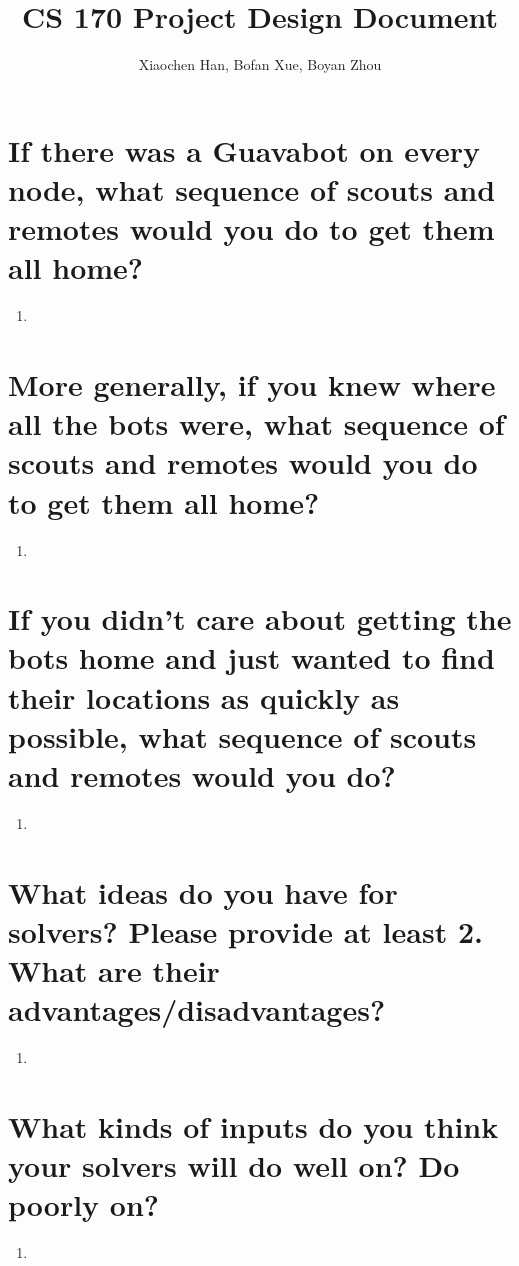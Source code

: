 \documentclass[10pt,a4paper]{article}
\author{Xiaochen Han, Bofan Xue, Boyan Zhou}
\title{CS 170 Project Design Document}
\begin{document}
\maketitle

\section{If there was a Guavabot on every node, what sequence of scouts and remotes would you do to get them all home?}
\begin{enumerate}[label=(\alph*)]
\item
\end{enumerate}

\section{More generally, if you knew where all the bots were, what sequence of scouts and remotes would you do to get them all home?}
\begin{enumerate}[label=(\alph*)]
\item
\end{enumerate}

\section{If you didn't care about getting the bots home and just wanted to find their locations as quickly as possible, what sequence of scouts and remotes would you do?}
\begin{enumerate}[label=(\alph*)]
\item
\end{enumerate}

\section{What ideas do you have for solvers? Please provide at least 2. What are their advantages/disadvantages?}
\begin{enumerate}[label=(\alph*)]
\item
\end{enumerate}

\section{What kinds of inputs do you think your solvers will do well on? Do poorly on?}
\begin{enumerate}[label=(\alph*)]
\item
\end{enumerate}
\end{document}
